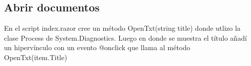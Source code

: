 \documentclass[a4paper,12pt]{article}
\begin{document}
    \subsection{Abrir documentos}\label{sub:Explain OpenDocs}
    En el script index.razor cree un método OpenTxt(string title) donde utlizo la clase Process de System.Diagnostics.
    Luego en donde se muestra el título añadí un hipervínculo con un evento @onclick que llama al método OpenTxt(item.Title)
\end{document}

